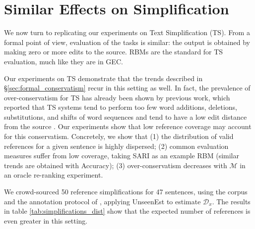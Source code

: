 \documentclass[letterpaper, 11pt]{article}
\newcommand{\oa}[1]{\footnote{\color{red}OA: #1}}
\begin{document}



\section{Similar Effects on Simplification}\label{sec:simplification}

We now turn to replicating our experiments on Text Simplification (TS). From a formal point of view, evaluation of the tasks is similar:
the output is obtained by making zero or more edits to the source. RBMs are the standard for TS evaluation,
much like they are in GEC.

Our experiments on TS demonstrate that the trends described in \S\ref{sec:formal_conservatism} recur in this setting as well. 
In fact, the prevalence of over-conservatism for TS has already been shown by previous work, 
which reported that TS systems tend to perform too few word additions, deletions,
substitutions, and shifts of word sequences \cite{zhang2017sentence} 
and tend to have a low edit distance from the source \cite{narayan2015unsupervised}.
Our experiments show that low reference coverage may account for this conservatism. Concretely, we show that
(1) the distribution of valid references for a given sentence is highly dispersed; 
(2) common evaluation measures suffer from low coverage, taking SARI \cite{Xu-EtAl:2016:TACL} 
as an example RBM (similar trends are obtained with Accuracy); 
(3) over-conservatism decreases with $\mathcal{M}$ in an oracle re-ranking experiment.

We crowd-sourced 50 reference simplifications for 47 sentences, using the corpus and the annotation protocol of 
, applying {\sc UnseenEst} to estimate $\mathcal{D}_x$.
The results in table \ref{tab:simplifications_dist} show that the expected number of references is even greater in this setting. 
\end{document}
